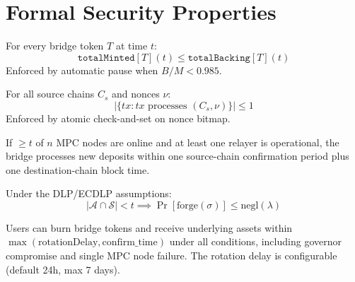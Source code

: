 \section{Formal Security Properties}

\label{sec:security}

\begin{property}[Conservation]
For every bridge token $T$ at time $t$:
\begin{equation}
  \texttt{totalMinted}[T](t) \leq \texttt{totalBacking}[T](t)
\end{equation}
Enforced by automatic pause when $B / M < 0.985$.
\end{property}

\begin{property}[Uniqueness]
For all source chains $C_s$ and nonces $\nu$:
\begin{equation}
  \bigl|\{tx : tx \text{ processes } (C_s, \nu)\}\bigr| \leq 1
\end{equation}
Enforced by atomic check-and-set on nonce bitmap.
\end{property}

\begin{property}[Liveness]
If $\geq t$ of $n$ MPC nodes are online and at least one relayer is operational, the bridge processes new deposits within one source-chain confirmation period plus one destination-chain block time.
\end{property}

\begin{property}[Safety]
Under the DLP/ECDLP assumptions:
\begin{equation}
  |\mathcal{A} \cap \mathcal{S}| < t \implies \Pr[\text{forge}(\sigma)] \leq \text{negl}(\lambda)
\end{equation}
\end{property}

\begin{property}
Users can burn bridge tokens and receive underlying assets within $\max(\text{rotationDelay}, \text{confirm\_time})$ under all conditions, including governor compromise and single MPC node failure. The rotation delay is configurable (default 24h, max 7 days).
\end{property}

